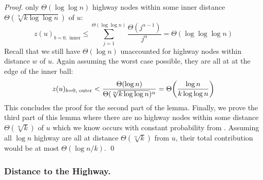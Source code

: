 \begin{proof}
    only $\Theta(\log{\log{n}})$ highway nodes within some inner distance
    $\Theta(\sqrt[\alpha]{k \log{\log{n}}})$ of $u$:
    \begin{equation*}
        z(u)_{b = 0, \text{ inner}} \leq \sum_{j = 1}^{\Theta(\log{\log{n}})}{\frac{\Theta(j^{\alpha - 1})}{j^\alpha}} = \Theta(\log{\log{\log{n}}})
    \end{equation*}
    Recall that we still have $\Theta(\log{n})$ unaccounted for highway nodes
    within distance $w$ of $u$.
    Again assuming the worst case possible, they are all at at the edge of the
    inner ball:
    \begin{equation*}
        z(u)_{b = 0, \text{ outer}} < \frac{\Theta(\log{n})}{\Theta(\sqrt[\alpha]{k \log{\log{n}}})^\alpha} = \Theta\pars*{\frac{\log{n}}{k \log{\log{n}}}}
    \end{equation*}
    This concludes the proof for the second part of the lemma.
    Finally, we prove the third part of this lemma where there are no highway
    nodes within some distance $\Theta(\sqrt[\alpha]{k})$ of $u$ which we know
    occurs with constant probability from
    .
    Assuming all $\log{n}$ highway are all at distance
    $\Theta(\sqrt[\alpha]{k})$ from $u$, their total contribution would be at
    most $\Theta(\log{n} / k)$.
    \qed
\end{proof}

\subsubsection{Distance to the Highway.}

